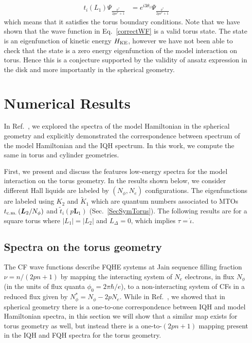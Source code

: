 \documentclass[prb,aps,epsfig,longbibliography,twocolumn]{revtex4-1}
\newcommand{\bsym}[1]{\boldsymbol{#1}}
\newcommand{\rbkt}[1]{\left( #1\right)}
\newcommand{\np}{N_{\phi}}
\newcommand{\iiota}{\dot{\iota}}
\begin{document}
\begin{align}
t_i(L_1)\Psi_{\frac{\nu^*}{2p\nu^*+1}}&=e^{i3\theta_1}\Psi_{\frac{\nu^*}{2p\nu^*+1}}
\end{align}
which means that it satisfies the torus boundary conditions. Note that we have shown that the wave function in Eq.~\eqref{correctWF} is a valid torus state. The state is an eigenfunction of kinetic energy $H_{\rm KE}$, 
however we have not been able to check that the state is a zero energy eigenfunction of the model interaction on torus. Hence this is a conjecture supported by the validity of ansatz expression in the disk and more importantly in the spherical geometry.

\section{Numerical Results} \label{NumRes}
In Ref.~, we explored the spectra of the model Hamiltonian in the spherical geometry and explicitly demonstrated the correspondence between spectrum of the model Hamiltonian and the IQH spectrum. In this work, we compute the same in torus and cylinder geometries.   

First, we present and discuss the features low-energy spectra for the model interaction on the torus geometry. In the results shown below, we consider different Hall liquids are labeled by $(\np,N_e)$ configurations. The eigenfunctions are labeled using $K_2$ and $\tilde{K}_1$ which are quantum numbers associated to MTOs $t_{\rm c.m.}\rbkt{\bsym{L}_2/\np}$ and ${\tilde{t}}_i (p \bsym{L}_1)$ (Sec.~\ref{SecSymTorus}). The following results are for a square torus where $|L_1|=|L_2|$ and $L_\Delta=0$, which implies  $\tau=\iiota$.

\subsection{Spectra on the torus geometry}
The CF wave functions\cite{Jain89} describe FQHE systems at Jain sequence filling fraction $\nu=n/(2pn+1)$ by mapping the interacting system of $N_e$ electrons, in flux $\np$ (in the units of flux quanta $\phi_0=2\pi \hbar/e$), to a non-interacting system of CFs in a reduced flux given by $\np^{*}=\np-2pN_e$. While in Ref.~, we showed that in spherical geometry there is a one-to-one correspondence between IQH and model Hamiltonian spectra, in this section we will show that a similar map exists for torus geometry as well, but instead there is a one-to-$(2pn+1)$ mapping present in the IQH and FQH spectra for the torus geometry.
\end{document}
